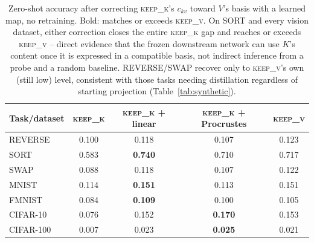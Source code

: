 \documentclass[11pt]{article}
\begin{document}
\begin{table}[h]
\centering
\small
\begin{tabular}{lcccc}
\toprule
Task/dataset & \textsc{keep\_k} & \textsc{keep\_k} + linear & \textsc{keep\_k} + Procrustes & \textsc{keep\_v} \\
\midrule
REVERSE   & 0.100 & 0.118 & 0.107 & 0.123 \\
SORT      & 0.583 & \textbf{0.740} & 0.710 & 0.717 \\
SWAP      & 0.088 & 0.118 & 0.107 & 0.122 \\
MNIST     & 0.114 & \textbf{0.151} & 0.113 & 0.151 \\
FMNIST    & 0.084 & \textbf{0.109} & 0.100 & 0.105 \\
CIFAR-10  & 0.076 & 0.152 & \textbf{0.170} & 0.153 \\
CIFAR-100 & 0.007 & 0.023 & \textbf{0.025} & 0.021 \\
\bottomrule
\end{tabular}
\caption{Zero-shot accuracy after correcting \textsc{keep\_k}'s $c_{kv}$ toward
$V$'s basis with a learned map, no retraining. Bold: matches or exceeds
\textsc{keep\_v}. On SORT and every vision dataset, either correction closes the
entire \textsc{keep\_k} gap and reaches or exceeds \textsc{keep\_v} -- direct
evidence that the frozen downstream network can use $K$'s content once it is
expressed in a compatible basis, not indirect inference from a probe and a random
baseline. REVERSE/SWAP recover only to \textsc{keep\_v}'s own (still low) level,
consistent with those tasks needing distillation regardless of starting
projection (Table~\ref{tab:synthetic}).}
\label{tab:alignment}
\end{table}
\end{document}
